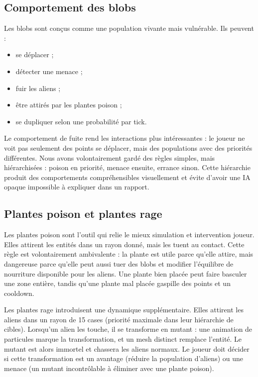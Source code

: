 ﻿\documentclass[11pt,a4paper]{article}
\begin{document}
\subsection{Comportement des blobs}

Les blobs sont conçus comme une population vivante mais vulnérable. Ils peuvent :

\begin{itemize}[noitemsep]
  \item se déplacer ;
  \item détecter une menace ;
  \item fuir les aliens ;
  \item être attirés par les plantes poison ;
  \item se dupliquer selon une probabilité par tick.
\end{itemize}

Le comportement de fuite rend les interactions plus intéressantes : le joueur ne voit pas seulement des points se déplacer, mais des populations avec des priorités différentes. Nous avons volontairement gardé des règles simples, mais hiérarchisées : poison en priorité, menace ensuite, errance sinon. Cette hiérarchie produit des comportements compréhensibles visuellement et évite d'avoir une IA opaque impossible à expliquer dans un rapport.

\subsection{Plantes poison et plantes rage}

Les plantes poison sont l'outil qui relie le mieux simulation et intervention joueur. Elles attirent les entités dans un rayon donné, mais les tuent au contact. Cette règle est volontairement ambivalente : la plante est utile parce qu'elle attire, mais dangereuse parce qu'elle peut aussi tuer des blobs et modifier l'équilibre de nourriture disponible pour les aliens. Une plante bien placée peut faire basculer une zone entière, tandis qu'une plante mal placée gaspille des points et un cooldown.

Les plantes rage introduisent une dynamique supplémentaire. Elles attirent les aliens dans un rayon de 15 cases (priorité maximale dans leur hiérarchie de cibles). Lorsqu'un alien les touche, il se transforme en mutant : une animation de particules marque la transformation, et un mesh distinct remplace l'entité. Le mutant est alors immortel et chassera les aliens normaux. Le joueur doit décider si cette transformation est un avantage (réduire la population d'aliens) ou une menace (un mutant incontrôlable à éliminer avec une plante poison).
\end{document}
